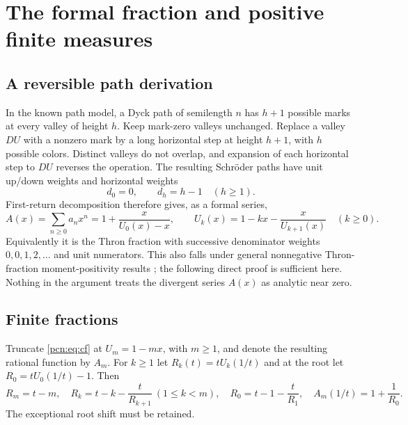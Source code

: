 \documentclass[11pt,letterpaper]{article}
\theoremstyle{remark}\newtheorem{remark}[theorem]{Remark}
\begin{document}
\section{The formal fraction and positive finite measures}
\subsection{A reversible path derivation}
In the known path model, a Dyck path of semilength $n$ has $h+1$ possible marks at every valley of height $h$. Keep mark-zero valleys unchanged. Replace a valley $DU$ with a nonzero mark by a long horizontal step at height $h+1$, with $h$ possible colors. Distinct valleys do not overlap, and expansion of each horizontal step to $DU$ reverses the operation. The resulting Schr\"oder paths have unit up/down weights and horizontal weights
\[
 d_0=0,\qquad d_h=h-1\quad(h\ge1).
\]
First-return decomposition therefore gives, as a formal series,
\begin{equation}\label{pcn:eq:cf}
 A(x)=\sum_{n\ge0}a_nx^n=1+\frac{x}{U_0(x)-x},\qquad
 U_k(x)=1-kx-\frac{x}{U_{k+1}(x)}\quad(k\ge0).
\end{equation}
Equivalently it is the Thron fraction with successive denominator weights $0,0,1,2,\ldots$ and unit numerators. This also falls under general nonnegative Thron-fraction moment-positivity results \cite{PSZ}; the following direct proof is sufficient here. Nothing in the argument treats the divergent series $A(x)$ as analytic near zero.

\subsection{Finite fractions}
Truncate \eqref{pcn:eq:cf} at $U_m=1-mx$, with $m\ge1$, and denote the resulting rational function by $A_m$. For $k\ge1$ let $R_k(t)=tU_k(1/t)$ and at the root let $R_0=tU_0(1/t)-1$. Then
\begin{equation}\label{pcn:eq:R}
 R_m=t-m,\quad R_k=t-k-\frac{t}{R_{k+1}}\ (1\le k<m),
 \quad R_0=t-1-\frac{t}{R_1},\quad A_m(1/t)=1+\frac1{R_0}.
\end{equation}
The exceptional root shift must be retained.
\end{document}
